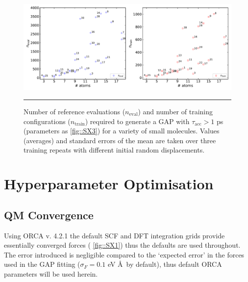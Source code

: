 \documentclass[11pt]{article}
\numberwithin{equation}{subsection}
\newcommand{\tacc}{$\tau_\text{acc}$}
\begin{document}
\begin{figure}[h!]
	\centering
	\vspace{0.4cm}
	\includegraphics[width=\textwidth]{figSX5.pdf}
	\hrule
	\vspace{0.1cm}
	\caption{Number of reference evaluations ($n_\text{eval}$) and number of training configurations ($n_\text{train}$) required to generate a GAP with \tacc $>1$ ps (parameters as \figurename{ \ref{fig::SX3}}) for a variety of small molecules. Values (averages) and standard errors of the mean are taken over three training repeats with different initial random displacements.}
	\label{fig::SX5}
\end{figure}



\clearpage
\section{Hyperparameter Optimisation} \label{section::SI_hyperparam_opt}
\label{section::hyperparam_opt}

\subsection{QM Convergence}


Using ORCA v. 4.2.1 the default SCF and DFT integration grids provide essentially converged forces (\figurename{ \ref{fig::SX1}}) thus the defaults are used throughout. The error introduced is negligible compared to the `expected error' in the forces used in the GAP fitting ($\sigma_F = 0.1$ eV \AA~by default), thus default ORCA parameters will be used herein.
\end{document}

